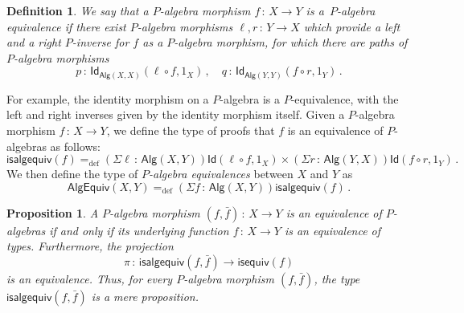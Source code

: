 \documentclass[10pt,a4paper,oneside,reqno]{amsart}
\theoremstyle{mythm}
\newtheorem{proposition}[theorem]{Proposition}
\theoremstyle{mydef}
\newtheorem{definition}[theorem]{Definition}
\theoremstyle{myrmk}
\newcommand{\ie}{\text{i.e.\ }}
\newcommand{\defeq}{=_{\mathrm{def}}}
\newcommand{\co}{\,{:}\,}
\newcommand{\Id}{\mathsf{Id}}
\newcommand{\Palg}{\mathsf{Alg}}
\newcommand{\isalgequiv}{\mathsf{isalgequiv}}
\newcommand{\AlgEquiv}{\mathsf{AlgEquiv}}
\begin{document}
\begin{definition} We say that a $P$-algebra morphism $f \co X \to Y$ is 
 a~\emph{$P$-algebra equivalence}
if there exist $P$-algebra morphisms $\ell,r \co Y \to X$  which provide a left and a right $P$-inverse for $f$ as a
$P$-algebra morphism, \ie for
which there are paths of $P$-algebra morphisms
\[ 
p \co \Id_{\Palg(X,X)}( \ell \circ f,  1_X) \, , \quad q \co \Id_{\Palg(Y,Y)}( f \circ r , 1_Y) \, .
\]
\end{definition}

For example, the identity morphism on a $P$-algebra is a $P$-equivalence, with the left and right inverses given by the identity morphism itself.  Given a $P$-algebra morphism $f \co X \to Y$, we define the type of proofs that $f$ is an equivalence of $P$-algebras as follows:
\[
\isalgequiv(f) \defeq  (\Sigma \ell \co  \Palg(X,Y)) \Id( \ell \circ f, 1_X )  \times 
    (\Sigma r  \co \Palg(Y, X)) \Id( f \circ r , 1_Y ) \, .
\]
We then define the type of \emph{$P$-algebra equivalences} between $X$ and $Y$ as
\[
\AlgEquiv(X, Y)
\defeq   (\Sigma f \co \Palg(X,Y)) \isalgequiv(f)  \, . 
\] 


\begin{proposition}\label{WAlgSpace} A $P$-algebra morphism $(f, \bar{f}) \co X \to Y$ is an equivalence of
$P$-algebras if and only
if its underlying function $f \co X \to Y$ is an equivalence of types. Furthermore, the projection
\[
\pi \co \isalgequiv(f, \bar{f})  \to \mathsf{isequiv}(f)  
\]
is an equivalence. Thus, for every $P$-algebra morphism $(f, \bar{f})$, the type $\isalgequiv(f, \bar{f})$ is
a mere proposition. 
\end{proposition}  
\end{document}
